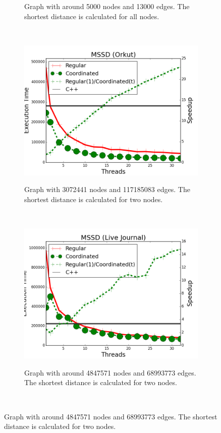 \begin{figure}[]
\begin{subfigure}[b]{\plotsize\textwidth}
                \label{fig:coordination:coord_sssp_uspowergrid}
                \caption{Graph with around 5000 nodes and 13000 edges. The
                shortest distance is calculated for all nodes.}
        \end{subfigure}\\
        \begin{subfigure}[b]{\plotsize\textwidth}
                \includegraphics[width=\textwidth]{experiments/coordination/cmp-shortest-orkut.png}
                \label{fig:coordination:coord_sssp_orkut}
                \caption{Graph with 3072441 nodes and 117185083 edges. The shortest
                   distance is calculated for two nodes.}
        \end{subfigure}
        ~
        \begin{subfigure}[b]{\plotsize\textwidth}
                \includegraphics[width=\textwidth]{experiments/coordination/cmp-shortest-livejournal.png}
                \label{fig:coordination:coord_sssp_livejournal}
                \caption{Graph with around 4847571 nodes and 68993773 edges. The
                shortest distance is calculated for two nodes.}
        \end{subfigure}\\


\end{figure}
